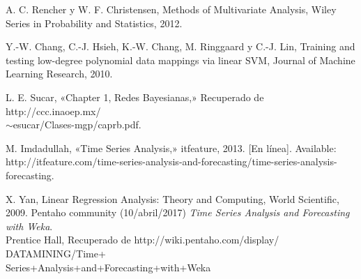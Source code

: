 \begin{thebibliography}{a}
	 A. C. Rencher y W. F. Christensen, Methods of Multivariate Analysis, Wiley Series in Probability and Statistics, 2012.

	 Y.-W. Chang, C.-J. Hsieh, K.-W. Chang, M. Ringgaard y C.-J. Lin, Training and testing low-degree
polynomial data mappings via linear SVM, Journal of Machine Learning Research, 2010.
	
	 L. E. Sucar, «Chapter 1, Redes Bayesianas,» Recuperado de
	http://ccc.inaoep.mx/\\$\sim$esucar/Clases-mgp/caprb.pdf. %

	 M. Imdadullah, «Time Series Analysis,» itfeature, 2013. [En línea]. Available:
http://itfeature.com/time-series-analysis-and-forecasting/time-series-analysis-forecasting.

	 X. Yan, Linear Regression Analysis: Theory and Computing, World Scientific,
2009.
	  Pentaho community (10/abril/2017) {\it Time Series Analysis and
	Forecasting with Weka}.\\ Prentice Hall, Recuperado de http://wiki.pentaho.com/display/
	DATAMINING/Time+\\Series+Analysis+and+Forecasting+with+Weka

\end{thebibliography}
